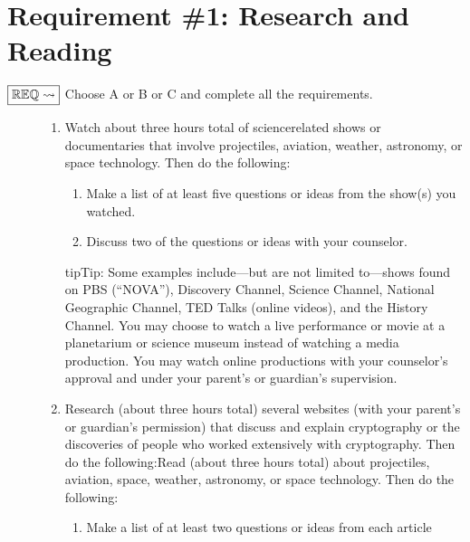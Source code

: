 \documentclass[letterpaper,10pt,english,openany,oneside]{sphinxmanual}
\begin{document}
\chapter{Requirement \#1: Research and Reading}
\label{\detokenize{requirement1:requirement-1-research-and-reading}}\label{\detokenize{requirement1::doc}}\begin{description}
\item[{\(\boxed{\mathbb{REQ}\Large \rightsquigarrow}\) Choose A or B or C and complete all the requirements.}] \leavevmode\begin{enumerate}
%
\item {} 
Watch about three hours total of science\sphinxhyphen{}related shows or documentaries that involve projectiles, aviation, weather, astronomy, or space technology. Then do the following:
\begin{enumerate}
%
\item {} 
Make a list of at least five questions or ideas from the show(s) you watched.

\item {} 
Discuss two of the questions or ideas with your counselor.

\end{enumerate}

\begin{sphinxadmonition}{tip}{Tip:}
Some examples include—but are not limited to—shows found on PBS (“NOVA”), Discovery Channel, Science Channel, National Geographic Channel, TED Talks (online videos), and the History Channel. You may choose to watch a live performance or movie at a planetarium or science museum instead of watching a media production. You may watch online productions with your counselor’s approval and under your parent’s or guardian’s supervision.
\end{sphinxadmonition}

\item {} 
Research (about three hours total) several websites (with your parent’s or guardian’s permission) that discuss and explain cryptography or the discoveries of people who worked extensively with cryptography. Then do the following:Read (about three hours total) about projectiles, aviation, space, weather, astronomy, or space technology. Then do the following:
\begin{enumerate}
%
\item {} 
Make a list of at least two questions or ideas from each article


\end{enumerate}
\end{enumerate}
\end{description}
\end{document}
